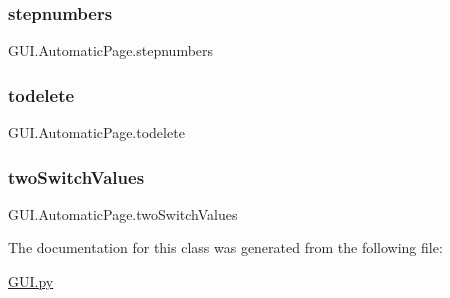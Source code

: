 \subsubsection{\texorpdfstring{stepnumbers}{stepnumbers}}
{\footnotesize\ttfamily G\+U\+I.\+Automatic\+Page.\+stepnumbers}

\mbox{\label{class_g_u_i_1_1_automatic_page_a74570f9298c69cb60f81e4caf616e37a}} 
\subsubsection{\texorpdfstring{todelete}{todelete}}
{\footnotesize\ttfamily G\+U\+I.\+Automatic\+Page.\+todelete}

\mbox{\label{class_g_u_i_1_1_automatic_page_a1f890c197f0c5fbb621bc850eff774ca}} 
\subsubsection{\texorpdfstring{twoSwitchValues}{twoSwitchValues}}
{\footnotesize\ttfamily G\+U\+I.\+Automatic\+Page.\+two\+Switch\+Values}



The documentation for this class was generated from the following file\+:\begin{DoxyCompactItemize}
\item 
\mbox{\hyperlink{_g_u_i_8py}{G\+U\+I.\+py}}\end{DoxyCompactItemize}
